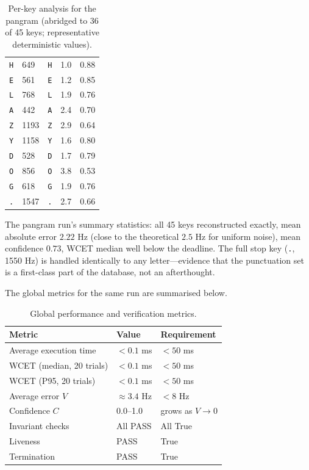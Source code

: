\documentclass[11pt,a4paper]{article}
\newcommand{\Key}[1]{\texttt{#1}}
\begin{document}
\begin{table}[H]
\begin{tabular}{@{}lllll@{}}
        \Key{H} & 649 & \Key{H} & 1.0 & 0.88 \\
        \Key{E} & 561 & \Key{E} & 1.2 & 0.85 \\
        \Key{L} & 768 & \Key{L} & 1.9 & 0.76 \\
        \Key{A} & 442 & \Key{A} & 2.4 & 0.70 \\
        \Key{Z} & 1193 & \Key{Z} & 2.9 & 0.64 \\
        \Key{Y} & 1158 & \Key{Y} & 1.6 & 0.80 \\
        \Key{D} & 528 & \Key{D} & 1.7 & 0.79 \\
        \Key{O} & 856 & \Key{O} & 3.8 & 0.53 \\
        \Key{G} & 618 & \Key{G} & 1.9 & 0.76 \\
        \Key{.} & 1547 & \Key{.} & 2.7 & 0.66 \\
        \bottomrule
    \end{tabular}
    \caption{Per-key analysis for the pangram (abridged to 36 of 45 keys;
             representative deterministic values).}
    \label{tab:pangram}
\end{table}

The pangram run's summary statistics: all 45 keys reconstructed exactly, mean
absolute error $2.22$ Hz (close to the theoretical $2.5$ Hz for uniform noise),
mean confidence $0.73$, WCET median well below the deadline. The full stop key
(\Key{.}, 1550 Hz) is handled identically to any letter---evidence that the
punctuation set is a first-class part of the database, not an afterthought.

The global metrics for the same run are summarised below.

\begin{table}[H]
    \centering
    \begin{tabular}{@{}lll@{}}
        \toprule
        \textbf{Metric} & \textbf{Value} & \textbf{Requirement} \\
        \midrule
        Average execution time & $< 0.1$ ms & $< 50$ ms \\
        WCET (median, 20 trials) & $< 0.1$ ms & $< 50$ ms \\
        WCET (P95, 20 trials) & $< 0.1$ ms & $< 50$ ms \\
        Average error $V$ & $\approx 3.4$ Hz & $< 8$ Hz \\
        Confidence $C$ & 0.0--1.0 & grows as $V \rightarrow 0$ \\
        Invariant checks & All PASS & All True \\
        Liveness & PASS & True \\
        Termination & PASS & True \\
        \bottomrule
    \end{tabular}
    \caption{Global performance and verification metrics.}
    \label{tab:metrics}
\end{table}
\end{document}
